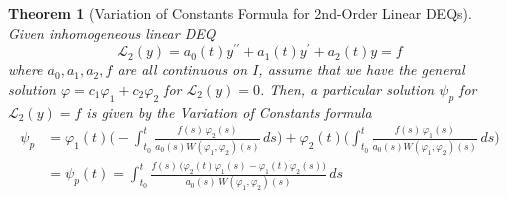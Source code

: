 \documentclass{article}
\newtheorem{theorem}{Theorem}[section]
\theoremstyle{remark}
\theoremstyle{definition}
\begin{document}
      \begin{theorem}[Variation of Constants Formula for 2nd-Order Linear DEQs]
      Given inhomogeneous linear DEQ
      \[\mathcal{L}_2(y) = a_0 (t) y^{\prime \prime} + a_1 (t) y^\prime + a_2 (t) y = f\]
      where $a_0, a_1, a_2, f$ are all continuous on $I$, assume that we have the general solution $\varphi = c_1 \varphi_1 + c_2 \varphi_2$ for $\mathcal{L}_2(y) = 0$. Then, a particular solution $\psi_p$ for $\mathcal{L}_2 (y) = f$ is given by the \textit{Variation of Constants formula} 
      \begin{align*}
          \psi_p & = \varphi_1 (t) \Bigg( - \int_{t_0}^t \frac{f(s)\,\varphi_2 (s)}{ a_0 (s) W(\varphi_1, \varphi_2) (s)}\,ds \Bigg) + \varphi_2 (t) \Bigg( \int_{t_0}^t \frac{f(s)\,\varphi_1 (s)}{ a_0 (s) W(\varphi_1, \varphi_2) (s)}\,ds \Bigg) \\
          & = \psi_p (t) = \int_{t_0}^t \frac{f(s) \, \big( \varphi_2 (t) \varphi_1 (s) - \varphi_1(t) \varphi_2 (s)\big)}{a_0 (s) \, W(\varphi_1, \varphi_2) (s)}\,ds
      \end{align*}
      \end{theorem}
\end{document}
